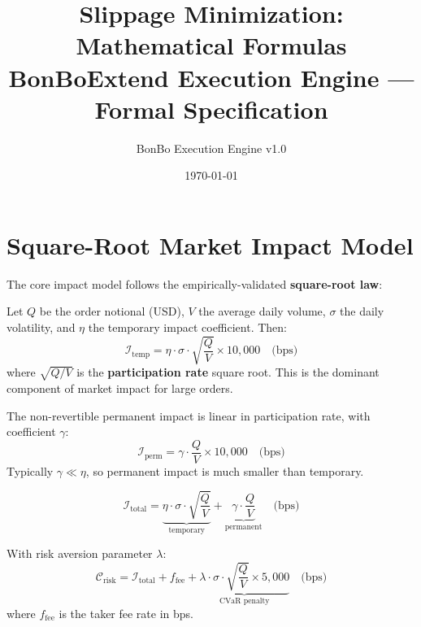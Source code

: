 \documentclass[11pt,a4paper]{article}
\title{\textbf{Slippage Minimization: Mathematical Formulas} \\[0.3em]
\large BonBoExtend Execution Engine — Formal Specification}
\author{BonBo Execution Engine v1.0}
\date{\today}
\begin{document}
\maketitle
\tableofcontents
\newpage

\section{Square-Root Market Impact Model}

The core impact model follows the empirically-validated \textbf{square-root law}:

\begin{formulabox}[title={\S1.1 — Temporary Impact (Square-Root Law)}]
Let $Q$ be the order notional (USD), $V$ the average daily volume, $\sigma$ the daily volatility, and $\eta$ the temporary impact coefficient. Then:
\begin{equation}
  \mathcal{I}_{\text{temp}} = \eta \cdot \sigma \cdot \sqrt{\frac{Q}{V}} \times 10{,}000 \quad \text{(bps)}
\end{equation}
where $\sqrt{Q/V}$ is the \textbf{participation rate} square root. This is the dominant component of market impact for large orders.
\end{formulabox}

\begin{formulabox}[title={\S1.2 — Permanent Impact (Linear Model)}]
The non-revertible permanent impact is linear in participation rate, with coefficient $\gamma$:
\begin{equation}
  \mathcal{I}_{\text{perm}} = \gamma \cdot \frac{Q}{V} \times 10{,}000 \quad \text{(bps)}
\end{equation}
Typically $\gamma \ll \eta$, so permanent impact is much smaller than temporary.
\end{formulabox}

\begin{formulabox}[title={\S1.3 — Total Market Impact}]
\begin{equation}
  \mathcal{I}_{\text{total}} = \underbrace{\eta \cdot \sigma \cdot \sqrt{\frac{Q}{V}}}_{\text{temporary}} + \underbrace{\gamma \cdot \frac{Q}{V}}_{\text{permanent}} \quad \text{(bps)}
\end{equation}
\end{formulabox}

\begin{formulabox}[title={\S1.4 — Risk-Adjusted Cost (CVaR Penalty)}]
With risk aversion parameter $\lambda$:
\begin{equation}
  \mathcal{C}_{\text{risk}} = \mathcal{I}_{\text{total}} + f_{\text{fee}} + \underbrace{\lambda \cdot \sigma \cdot \sqrt{\frac{Q}{V}} \times 5{,}000}_{\text{CVaR penalty}} \quad \text{(bps)}
\end{equation}
where $f_{\text{fee}}$ is the taker fee rate in bps.
\end{formulabox}
\end{document}
